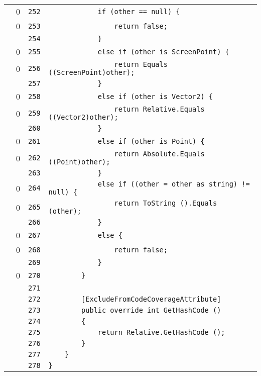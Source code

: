 \documentclass[a4paper,10pt]{article}
\begin{document}
\begin{longtable}[l]{lrrl}
\cellcolor{red} & 0 & \verb~252~ & \verb~            if (other == null) {~\\
\cellcolor{red} & 0 & \verb~253~ & \verb~                return false;~\\
\cellcolor{gray} &  & \verb~254~ & \verb~            }~\\
\cellcolor{red} & 0 & \verb~255~ & \verb~            else if (other is ScreenPoint) {~\\
\cellcolor{red} & 0 & \verb~256~ & \verb~                return Equals ((ScreenPoint)other);~\\
\cellcolor{gray} &  & \verb~257~ & \verb~            }~\\
\cellcolor{red} & 0 & \verb~258~ & \verb~            else if (other is Vector2) {~\\
\cellcolor{red} & 0 & \verb~259~ & \verb~                return Relative.Equals ((Vector2)other);~\\
\cellcolor{gray} &  & \verb~260~ & \verb~            }~\\
\cellcolor{red} & 0 & \verb~261~ & \verb~            else if (other is Point) {~\\
\cellcolor{red} & 0 & \verb~262~ & \verb~                return Absolute.Equals ((Point)other);~\\
\cellcolor{gray} &  & \verb~263~ & \verb~            }~\\
\cellcolor{red} & 0 & \verb~264~ & \verb~            else if ((other = other as string) != null) {~\\
\cellcolor{red} & 0 & \verb~265~ & \verb~                return ToString ().Equals (other);~\\
\cellcolor{gray} &  & \verb~266~ & \verb~            }~\\
\cellcolor{red} & 0 & \verb~267~ & \verb~            else {~\\
\cellcolor{red} & 0 & \verb~268~ & \verb~                return false;~\\
\cellcolor{gray} &  & \verb~269~ & \verb~            }~\\
\cellcolor{red} & 0 & \verb~270~ & \verb~        }~\\
\cellcolor{gray} &  & \verb~271~ & \verb~~\\
\cellcolor{gray} &  & \verb~272~ & \verb~        [ExcludeFromCodeCoverageAttribute]~\\
\cellcolor{gray} &  & \verb~273~ & \verb~        public override int GetHashCode ()~\\
\cellcolor{gray} &  & \verb~274~ & \verb~        {~\\
\cellcolor{gray} &  & \verb~275~ & \verb~            return Relative.GetHashCode ();~\\
\cellcolor{gray} &  & \verb~276~ & \verb~        }~\\
\cellcolor{gray} &  & \verb~277~ & \verb~    }~\\
\cellcolor{gray} &  & \verb~278~ & \verb~}~\\
\end{longtable}
\newpage
\end{document}
